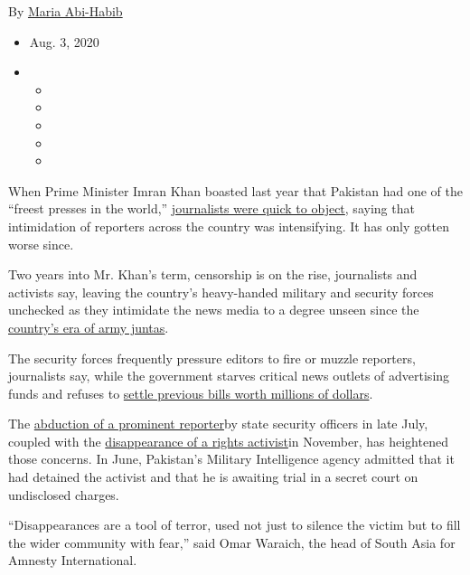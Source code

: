 By \href{https://www.nytimes.com/by/maria-abi-habib}{Maria Abi-Habib}

\begin{itemize}
\item
  Aug. 3, 2020
\item
  \begin{itemize}
  \item
  \item
  \item
  \item
  \item
  \end{itemize}
\end{itemize}

When Prime Minister Imran Khan boasted last year that Pakistan had one
of the ``freest presses in the world,''
\href{https://rsf.org/en/news/after-year-press-freedom-violations-rsf-writes-pakistans-premier}{journalists
were quick to object}, saying that intimidation of reporters across the
country was intensifying. It has only gotten worse since.

Two years into Mr. Khan's term, censorship is on the rise, journalists
and activists say, leaving the country's heavy-handed military and
security forces unchecked as they intimidate the news media to a degree
unseen since the
\href{https://tribune.com.pk/story/459782/when-musharraf-silenced-the-media}{country's
era of army juntas}.

The security forces frequently pressure editors to fire or muzzle
reporters, journalists say, while the government starves critical news
outlets of advertising funds and refuses to
\href{https://www.thenews.com.pk/print/659532-extraordinary-delay-in-payment-of-media-dues-apns-extremely-concerned-over-govt-inaction}{settle
previous bills worth millions of dollars}.

The \href{https://www.dawn.com/news/1570325}{abduction of a prominent
reporter}by state security officers in late July, coupled with the
\href{https://www.amnesty.org/en/get-involved/take-action/where-is-idris-khattak/}{disappearance
of a rights activist}in November, has heightened those concerns. In
June, Pakistan's Military Intelligence agency admitted that it had
detained the activist and that he is awaiting trial in a secret court on
undisclosed charges.

``Disappearances are a tool of terror, used not just to silence the
victim but to fill the wider community with fear,'' said Omar Waraich,
the head of South Asia for Amnesty International.

